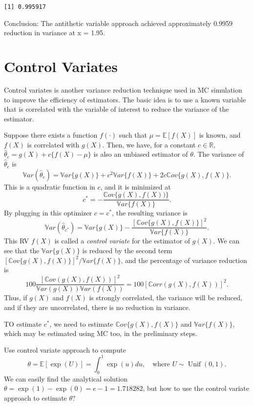 \documentclass[
  letterpaper,
  DIV=11,
  numbers=noendperiod]{scrreprt}
\begin{document}
\begin{verbatim}
[1] 0.995917
\end{verbatim}

Conclusion: The antithetic variable approach achieved approximately
0.9959 reduction in variance at x = 1.95.

\section{Control Variates}\label{control-variates}

Control variates is another variance reduction technique used in MC
simulation to improve the efficiency of estimators. The basic idea is to
use a known variable that is correlated with the variable of interest to
reduce the variance of the estimator.

Suppose there exists a function \(f(\cdot)\) such that
\(\mu=\mathbb{E}[f(X)]\) is known, and \(f(X)\) is correlated with
\(g(X)\). Then, we have, for a constant \(c\in\mathbb{R}\),
\(\hat{\theta}_c = g(X) + c\{f(X) - \mu\}\) is also an unbiased
estimator of \(\theta\). The variance of \(\hat{\theta}_c\) is \[
\mathbb{V}ar(\hat{\theta}_c) = \mathbb{V}ar\{g(X)\} + c^2\mathbb{V}ar\{f(X)\} + 2c\mathbb{C}ov\{g(X), f(X)\}.
\] This is a quadratic function in \(c\), and it is minimized at \[
c^*=-\frac{\mathbb{C}ov\{g(X), f(X))\}}{\mathbb{V}ar\{f(X)\}}.
\] By plugging in this optimizer \(c=c^\ast\), the resulting variance is
\[
\mathbb{V}ar(\hat{\theta}_{c^\ast}) = \mathbb{V}ar\{g(X)\} - \frac{[\mathbb{C}ov\{g(X), f(X)\}]^2}{\mathbb{V}ar\{f(X)\}}.
\] This RV \(f(X)\) is called a \emph{control variate} for the estimator
of \(g(X)\). We can see that the \(\mathbb{V}ar\{g(X)\}\) is reduced by
the second term \([\mathbb{C}ov\{g(X), f(X)\}]^2/\mathbb{V}ar\{f(X)\}\),
and the percentage of variance reduction is \[
100 \frac{[\mathbb{C}ov(g(X), f(X))]^2}{\mathbb{V}ar(g(X)) \mathbb{V}ar(f(X))}=100[\mathbb{C}orr(g(X), f(X))]^2 .
\] Thus, if \(g(X)\) and \(f(X)\) is strongly correlated, the variance
will be reduced, and if they are uncorrelated, there is no reduction in
variance.

TO estimate \(c^*\), we need to estimate \(\mathbb{C}ov\{g(X),f(X)\}\)
and \(\mathbb{V}ar\{f(X)\}\), which may be estimated using MC too, in
the preliminary steps.

Use control variate approach to compute \[
\theta = \mathbb{E}[\exp(U)] =\int_0^1\exp(u)du,\quad \text{where } U\sim\operatorname{Unif}(0,1).
\] We can easily find the analytical solution
\(\theta=\exp(1) - \exp(0) = e - 1 = 1.718282\), but how to use the
control variate approach to estimate \(\theta\)?
\end{document}

